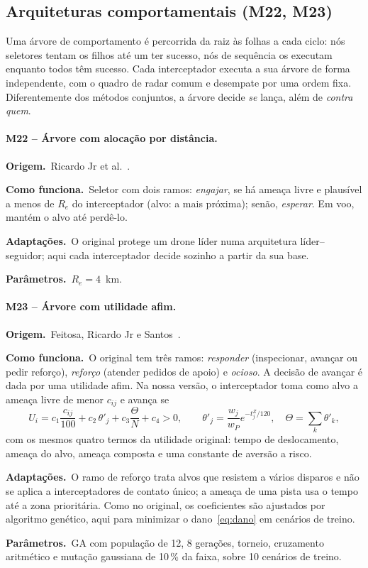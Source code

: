 \documentclass[11pt,a4paper]{article}
\newcommand{\orig}{\par\noindent\textbf{Origem.}~}
\newcommand{\func}{\par\noindent\textbf{Como funciona.}~}
\newcommand{\adap}{\par\noindent\textbf{Adaptações.}~}
\newcommand{\parm}{\par\noindent\textbf{Parâmetros.}~}
\begin{document}
\subsection{Arquiteturas comportamentais (M22, M23)}

Uma árvore de comportamento é percorrida da raiz às folhas a cada ciclo: nós seletores tentam os filhos até um ter
sucesso, nós de sequência os executam enquanto todos têm sucesso. Cada interceptador executa a sua árvore de forma
independente, com o quadro de radar comum e desempate por uma ordem fixa. Diferentemente dos métodos conjuntos, a árvore
decide \emph{se} lança, além de \emph{contra quem}.

\paragraph{M22 -- Árvore com alocação por distância.}
\orig Ricardo Jr et al.~\cite{ricardo2023}.
\func Seletor com dois ramos: \emph{engajar}, se há ameaça livre e plausível a menos de $R_e$ do interceptador (alvo: a
mais próxima); senão, \emph{esperar}. Em voo, mantém o alvo até perdê-lo.
\adap O original protege um drone líder numa arquitetura líder--seguidor; aqui cada interceptador decide sozinho a partir
da sua base.
\parm $R_e=4$~km.

\paragraph{M23 -- Árvore com utilidade afim.}
\orig Feitosa, Ricardo Jr e Santos~\cite{feitosa2025}.
\func O original tem três ramos: \emph{responder} (inspecionar, avançar ou pedir reforço), \emph{reforço} (atender
pedidos de apoio) e \emph{ocioso}. A decisão de avançar é dada por uma utilidade afim. Na nossa versão, o interceptador
toma como alvo a ameaça livre de menor $c_{ij}$ e avança se
\begin{equation}
  U_i = c_1\frac{c_{ij}}{100} + c_2\,\theta'_j + c_3\frac{\Theta}{N} + c_4 > 0,\qquad
  \theta'_j=\frac{w_j}{w_P}e^{-t^Z_j/120},\quad \Theta=\sum_{k}\theta'_k,
  \label{eq:util}
\end{equation}
com os mesmos quatro termos da utilidade original: tempo de deslocamento, ameaça do alvo, ameaça composta e uma
constante de aversão a risco.
\adap O ramo de reforço trata alvos que resistem a vários disparos e não se aplica a interceptadores de contato único;
a ameaça de uma pista usa o tempo até a zona prioritária. Como no original, os coeficientes são ajustados por algoritmo
genético, aqui para minimizar o dano~\eqref{eq:dano} em cenários de treino.
\parm GA com população de 12, 8 gerações, torneio, cruzamento aritmético e mutação gaussiana de 10\,\% da faixa, sobre 10
cenários de treino.
\end{document}
